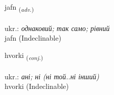 \documentclass[frontgrid, backgrid]{flacards}\usepackage[]{graphicx}\usepackage[]{xcolor}
\begin{document}
\renewcommand{\flhead}{\vskip5pt \fboxsep=0pt {\small\bfseries\footnotesize Atviksorð | прислівник}}
\renewcommand{\fcfoot}{\vskip5pt \fboxsep=0pt \hspace{2pt}{\small\bfseries\footnotesize 1K}}

\renewcommand{\blhead}{\vskip5pt {\small\bfseries\footnotesize Atviksorð | прислівник }}
\renewcommand{\bcfoot}{\vskip5pt \hspace{2pt}{\small\bfseries\footnotesize 1K}}


{jafn \small{\textsubscript{(\textit{adv.})}} \\[1ex]
\textphonetic{[japn̥]} \\
ukr.: \emph{однаковий; так само; рівний} \\  [2ex]
jafn (Indeclinable)}


\renewcommand{\flhead}{\vskip5pt \fboxsep=0pt {\small\bfseries\footnotesize Samtenging | сполучник}}
\renewcommand{\fcfoot}{\vskip5pt \fboxsep=0pt \hspace{2pt}{\small\bfseries\footnotesize 1K}}

\renewcommand{\blhead}{\vskip5pt {\small\bfseries\footnotesize Samtenging | сполучник }}
\renewcommand{\bcfoot}{\vskip5pt \hspace{2pt}{\small\bfseries\footnotesize 1K}}


{hvorki \small{\textsubscript{(\textit{conj.})}} \\[1ex]
\textphonetic{[kʰvɔr̥cɪ]} \\
ukr.: \emph{ані; ні (ні той..ні інший)} \\  [2ex]
hvorki (Indeclinable)}

\renewcommand{\flhead}{\vskip5pt \fboxsep=0pt {\small\bfseries\footnotesize Nafnorð | іменник}}
\renewcommand{\fcfoot}{\vskip5pt \fboxsep=0pt \hspace{2pt}{\small\bfseries\footnotesize 1K}}

\renewcommand{\blhead}{\vskip5pt {\small\bfseries\footnotesize Nafnorð | іменник }}
\renewcommand{\bcfoot}{\vskip5pt \hspace{2pt}{\small\bfseries\footnotesize 1K}}
\end{document}
